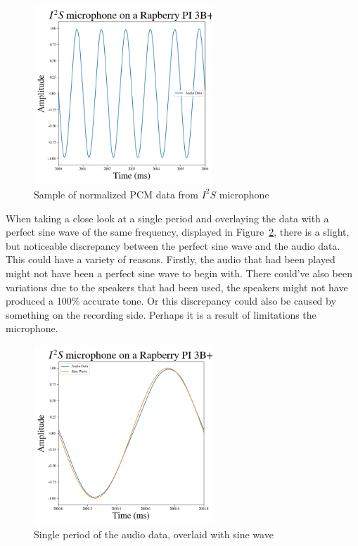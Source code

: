 \begin{figure}[H]
    \centering
    \includegraphics[width=0.6\textwidth]{figures/i2s/i2s_data_recording.png}
    \caption[Sample of normalized PCM data from $I^2S$ microphone]{Sample of normalized PCM data from $I^2S$ microphone}
    \label{fig:i2s_section}
\end{figure}

When taking a close look at a single period and overlaying the data with a perfect sine wave of the same
frequency, displayed in Figure~\ref{fig:i2s_period}, there is a slight, but noticeable discrepancy between the perfect sine
wave and the audio data.
This could have a variety of reasons.
Firstly, the audio that had been played might not have been a perfect sine wave to begin with.
There could've also been variations due to the speakers that had been used, the speakers
might not have produced a 100\% accurate tone.
Or this discrepancy could also be caused by something on the recording side.
Perhaps it is a result of limitations the microphone.

\begin{figure}[H]
    \centering
    \includegraphics[width=0.6\textwidth]{figures/i2s/i2s_one_period.png}
    \caption[A single period of the normalized audio data, overlaid with perfect sine wave of the same frequency]{Single period of the audio data, overlaid with sine wave}
    \label{fig:i2s_period}
\end{figure}

